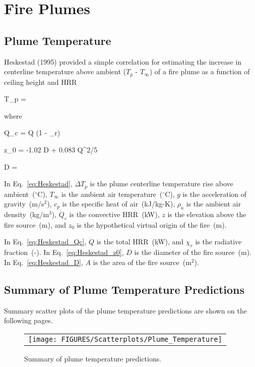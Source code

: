 \chapter{Fire Plumes}
\label{Plume_Chapter}

\section{Plume Temperature}

Heskestad (1995) provided a simple correlation for estimating the increase in centerline temperature above ambient ($T_p$ - $T_\infty$) of a fire plume as a function of ceiling height and HRR

\be
\Delta T_p = 
\label{eq:Heskestad}
\ee

\noindent where

\be
\dot Q_c = \dot Q (1 - \chi_r)
\label{eq:Heskestad_Qc}
\ee

\be
z_0 = -1.02 D + 0.083 \dot Q^{2/5}
\label{eq:Heskestad_z0}
\ee

\be
D = 
\label{eq:Heskestad_D}
\ee

In Eq.~\ref{eq:Heskestad}, $\Delta T_p$ is the plume centerline temperature rise above ambient~($^\circ$C), $T_\infty$ is the ambient air temperature~($^\circ$C), $g$ is the acceleration of gravity~(m/s$^2$), $c_p$ is the specific heat of air~(kJ/kg-K), $\rho_{a}$ is the ambient air density~(kg/m$^3$), $\dot Q_c$ is the convective HRR~(kW), $z$ is the elevation above the fire source~(m), and $z_0$ is the hypothetical virtual origin of the fire~(m).

In Eq.~\ref{eq:Heskestad_Qc}, $\dot Q$ is the total HRR~(kW), and $\chi_r$ is the radiative fraction~(-). In Eq.~\ref{eq:Heskestad_z0}, $D$ is the diameter of the fire source~(m). In Eq.~\ref{eq:Heskestad_D}, $A$ is the area of the fire source~(m$^2$).

\clearpage

\section{Summary of Plume Temperature Predictions}

Summary scatter plots of the plume temperature predictions are shown on the following pages.

\begin{figure}[ht]
\begin{center}
\begin{tabular}{l}
\texttt{[image: FIGURES/Scatterplots/Plume\_Temperature]}
\end{tabular}
\end{center}
\caption[Summary of plume temperature predictions.]
{Summary of plume temperature predictions.}
\label{Plume_Summary}
\end{figure}

